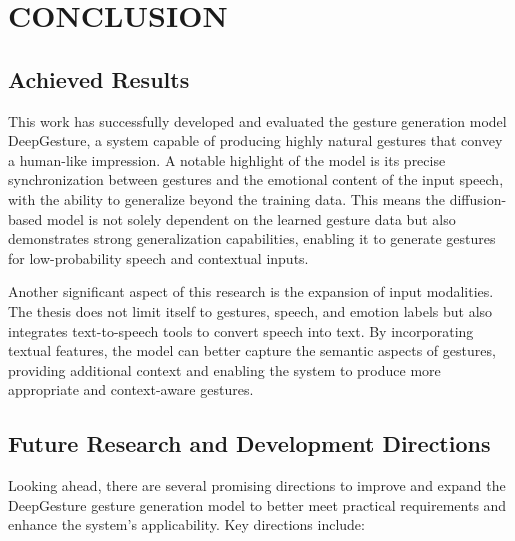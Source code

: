 \section{CONCLUSION}
\label{sec:conclusion}



\subsection{Achieved Results}

This work has successfully developed and evaluated the gesture generation model DeepGesture, a system capable of producing highly natural gestures that convey a human-like impression. A notable highlight of the model is its precise synchronization between gestures and the emotional content of the input speech, with the ability to generalize beyond the training data. This means the diffusion-based model is not solely dependent on the learned gesture data but also demonstrates strong generalization capabilities, enabling it to generate gestures for low-probability speech and contextual inputs.

Another significant aspect of this research is the expansion of input modalities. The thesis does not limit itself to gestures, speech, and emotion labels but also integrates text-to-speech tools to convert speech into text. By incorporating textual features, the model can better capture the semantic aspects of gestures, providing additional context and enabling the system to produce more appropriate and context-aware gestures.


\subsection{Future Research and Development Directions}

Looking ahead, there are several promising directions to improve and expand the DeepGesture gesture generation model to better meet practical requirements and enhance the system’s applicability. Key directions include:

